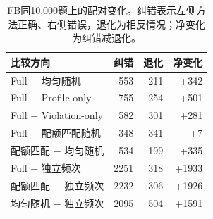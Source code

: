 \begin{table}[htbp]
\caption{FB同10,000题上的配对变化。纠错表示左侧方法正确、右侧错误，退化为相反情况；净变化为纠错减退化。}
\label{tab:fb-paired}
\centering\small
\begin{tabular}{lrrr}
\toprule
比较方向 & 纠错 & 退化 & 净变化 \\
\midrule
Full $-$ 均匀随机 & 553 & 211 & +342 \\
Full $-$ Profile-only & 755 & 254 & +501 \\
Full $-$ Violation-only & 582 & 301 & +281 \\
Full $-$ 配额匹配随机 & 348 & 341 & +7 \\
配额匹配 $-$ 均匀随机 & 534 & 199 & +335 \\
Full $-$ 独立频次 & 2251 & 318 & +1933 \\
配额匹配 $-$ 独立频次 & 2232 & 306 & +1926 \\
均匀随机 $-$ 独立频次 & 2095 & 504 & +1591 \\
\bottomrule
\end{tabular}
\end{table}
